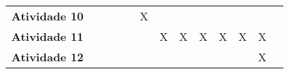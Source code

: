 \begin{table}
\begin{center}
\begin{small}
\begin{tabular}{p{5cm}cccccccccccc}
  \textbf{Atividade 10}          &             &             &             &             &      X      &             &             &             &             &             &             \\
  \textbf{Atividade 11}    &             &             &             &             &             &      X      &      X      &      X      &      X      &      X      &      X      \\
  \textbf{Atividade 12}     &             &             &             &             &             &             &             &             &             &             &      X      \\
  \bottomrule
\end{tabular}
\end{small}
\end{center}
\end{table}
